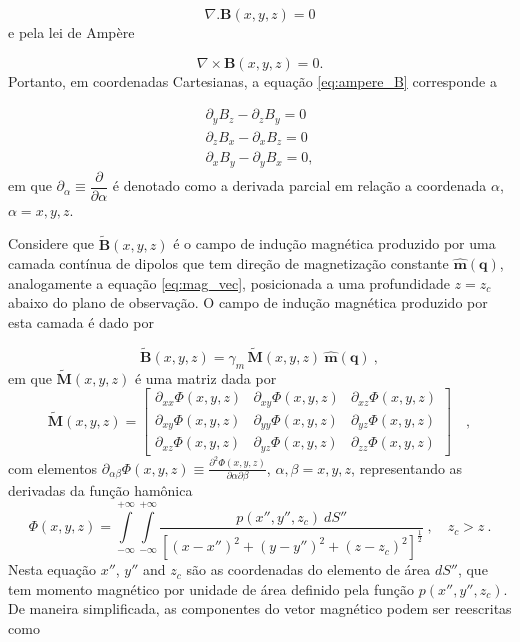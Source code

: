 \begin{equation}
\nabla . \mathbf{B} (x,y,z) = 0
\label{eq:gauss_B}
\end{equation}
e pela lei de Ampère 

\begin{equation}
\nabla \times \mathbf{B} (x,y,z) = 0.
\label{eq:ampere_B}
\end{equation}
Portanto, em coordenadas Cartesianas, a equação \ref{eq:ampere_B} corresponde a 

\begin{equation}
\begin{split}
\partial_y B_z - \partial_z B_y = 0 \\
\partial_z B_x - \partial_x B_z = 0 \\
\partial_x B_y - \partial_y B_x = 0, 
\end{split}
\label{eq:ampere_B_condicao}
\end{equation}
em que $\partial_\alpha \equiv \dfrac{\partial}{\partial \alpha}$ é denotado como a derivada parcial em relação a coordenada $\alpha$, $\alpha=x,y,z$. 

Considere que $\tilde{\mathbf{B}}(x,y,z)$ é o campo de indução magnética produzido por uma camada contínua de dipolos que tem direção de magnetização constante $\hat{\mathbf{m}} (\mathbf{q})$, analogamente a equação \ref{eq:mag_vec}, posicionada a uma profundidade $z=z_c$ abaixo do plano de observação. O campo de indução magnética produzido por esta camada é dado por 

\begin{equation}
\tilde{\mathbf{B}}(x, y, z) = \gamma_{m} \, \tilde{\mathbf{M}}(x, y, z) \: \hat{\mathbf{m}}(\mathbf{q}) \: ,
\label{eq:B-eqlayer}
\end{equation}
em que $\tilde{\mathbf{M}}(x, y, z)$ é uma matriz dada por 
\begin{equation}
\tilde{\mathbf{M}}(x, y, z) = \begin{bmatrix}
\partial_{xx} \Phi(x, y, z) & 
\partial_{xy} \Phi(x, y, z) &
\partial_{xz} \Phi(x, y, z) \\
\partial_{xy} \Phi(x, y, z) & 
\partial_{yy} \Phi(x, y, z) &
\partial_{yz} \Phi(x, y, z) \\
\partial_{xz} \Phi(x, y, z) & 
\partial_{yz} \Phi(x, y, z) &
\partial_{zz} \Phi(x, y, z)
\end{bmatrix} \quad ,
\label{eq:M-matriz-eqlayer-B}
\end{equation}
com elementos 
$\partial_{\alpha\beta} \Phi(x, y, z) \equiv 
\frac{\partial^{2} \Phi(x, y, z)}{\partial \alpha \partial \beta}$, 
$\alpha, \beta = x, y, z$, representando as derivadas da função hamônica 
\begin{equation}
\Phi(x, y, z) = \int\limits_{-\infty}^{+\infty}\int\limits_{-\infty}^{+\infty}
\frac{p(x'', y'', z_{c}) \: dS''}
{\left[ (x-x'')^2 + (y-y'')^2 + (z-z_{c})^2 \right]^{\frac{1}{2}}} \: ,
\quad z_{c} > z \: .
\label{eq:Phi-integral-superficie-B}
\end{equation}
Nesta equação $x''$, $y''$ and $z_{c}$ são as coordenadas do elemento de área $dS''$, que tem momento magnético por unidade de área definido pela função $p(x'', y'', z_{c})$. De maneira simplificada, as componentes do vetor magnético podem ser reescritas como

